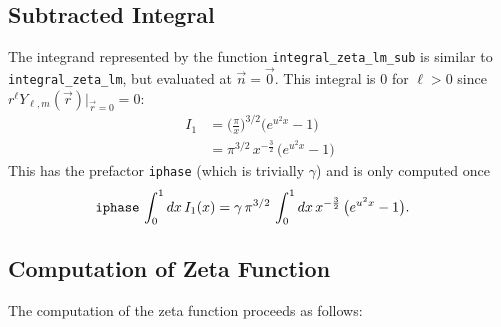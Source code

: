 \documentclass[a4paper]{article}
\begin{document}
\subsection{Subtracted Integral}

The integrand represented by the function {\tt integral\_zeta\_lm\_sub}
 is similar to {\tt integral\_zeta\_lm}, but evaluated at $\vec{n}=\vec{0}$.
This integral is 0 for $\ell > 0$ since $r^{\ell} Y_{\ell,m}(\vec{r})\big|_{\vec{r}=0} = 0$:
\begin{align}
 I_1
 &= \Big( \frac{\pi}{x} \Big)^{3/2}
 \big( e^{ u^{2}x } -1 \big) \nonumber\\
 &= \pi^{3/2} \, x^{-\frac{3}{2}} \,
 \big( e^{ u^{2} x } - 1 \big)
\end{align}
This has the prefactor {\tt iphase} (which is trivially $\gamma$) and is only computed once
\begin{align}
 {\tt iphase} \, \int_{0}^{1} dx \, I_1(x)
 &= \gamma \, \pi^{3/2} \, \int_{0}^{1} dx \, x^{- \frac{3}{2}} \,
 \big( e^{ u^{2} x } - 1 \big) .
\end{align}

\subsection{Computation of Zeta Function}

The computation of the zeta function proceeds as follows:
\end{document}
